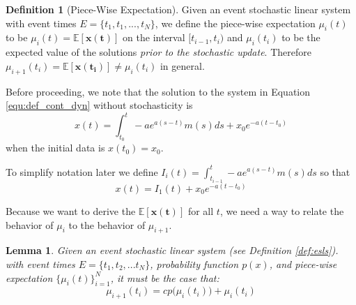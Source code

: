 \documentclass{journal}
\theoremstyle{definition}
\newtheorem{definition}{Definition}
\newtheorem{lemma}{Lemma}
\begin{document}
\begin{definition}[Piece-Wise Expectation]\label{def:piece}
Given an event stochastic linear system with event times $E = \{t_1, t_1, ..., t_N\}$, we define the piece-wise expectation $\mu_i(t)$ to be $\mu_i(t) = \mathbb{E}[\mathbf{x(t)}]$ on the interval $[t_{i-1}, t_i)$ and $\mu_i(t_i)$ to be the expected value of the solutions \textit{prior to the stochastic update}. Therefore $\mu_{i+1}(t_i) = \mathbb{E}[\mathbf{x(t_i)}] \neq \mu_i(t_i)$ in general.
\end{definition}

Before proceeding, we note that the solution to the system in Equation \ref{equ:def_cont_dyn} without stochasticity is
\begin{equation*} 
x(t) = \int_{t_0}^t -ae^{a(s-t)}m(s)ds + x_0 e^{-a(t-t_0)}
\end{equation*}
when the initial data is $x(t_0) = x_0$.

To simplify notation later we define $I_i(t) = \int_{t_{i-1}}^t -ae^{a(s-t)}m(s)ds$ so that
\begin{equation} \label{equ:cont_sol}
x(t) = I_1(t) + x_0 e^{-a(t-t_0)}
\end{equation}

Because we want to derive the $\mathbb{E}[\mathbf{x(t)}]$ for all $t$, we need a way to relate the behavior of $\mu_i$ to the behavior of $\mu_{i+1}$.

\begin{lemma} \label{thm:update_relate}
\textit{Given an event stochastic linear system (see Definition \ref{def:esls}). with event times $E = \{t_1, t_2, ... t_N\}$, probability function $p(x)$, and piece-wise expectation $\{\mu_i(t)\}_{i=1}^N$, it must be the case that:
\begin{equation}\label{equ:update_relate}
\mu_{i+1}(t_i) = cp\big(\mu_i(t_i)\big) + \mu_i(t_i)
\end{equation}
}
\end{lemma}
\end{document}
